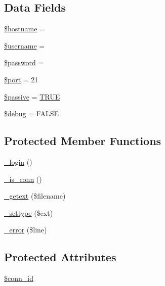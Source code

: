 \subsection*{Data Fields}
\begin{DoxyCompactItemize}
\item 
\mbox{\hyperlink{class_c_i___f_t_p_a8bf9ffb42ed554b203b55377d1fc9aa4}{\$hostname}} = \textquotesingle{}\textquotesingle{}
\item 
\mbox{\hyperlink{class_c_i___f_t_p_a0eb82aa5f81cf845de4b36cd653c42cf}{\$username}} = \textquotesingle{}\textquotesingle{}
\item 
\mbox{\hyperlink{class_c_i___f_t_p_a607686ef9f99ea7c42f4f3dd3dbb2b0d}{\$password}} = \textquotesingle{}\textquotesingle{}
\item 
\mbox{\hyperlink{class_c_i___f_t_p_aa0787efab4b22e8a212882f3409d4c77}{\$port}} = 21
\item 
\mbox{\hyperlink{class_c_i___f_t_p_a9fb61732ea9189fa2be5574ad3576d9c}{\$passive}} = \mbox{\hyperlink{constants_8php_ae04a3efe6aa42044f803ee90c2277846}{T\+R\+UE}}
\item 
\mbox{\hyperlink{class_c_i___f_t_p_a85ae3e64cd40e9564adceb010085e9dd}{\$debug}} = F\+A\+L\+SE
\end{DoxyCompactItemize}
\subsection*{Protected Member Functions}
\begin{DoxyCompactItemize}
\item 
\mbox{\hyperlink{class_c_i___f_t_p_a95562e7b8a41561f4b0b525d9c7fe701}{\+\_\+login}} ()
\item 
\mbox{\hyperlink{class_c_i___f_t_p_af20c08e4b61fe028e032b388cd73936a}{\+\_\+is\+\_\+conn}} ()
\item 
\mbox{\hyperlink{class_c_i___f_t_p_ab06ef33f96f03cafbb8f2bb6d695ef1f}{\+\_\+getext}} (\$filename)
\item 
\mbox{\hyperlink{class_c_i___f_t_p_aacd9d6628615078d8df9aab1fe70e391}{\+\_\+settype}} (\$ext)
\item 
\mbox{\hyperlink{class_c_i___f_t_p_ac618e7d56614851d2c54aa096e1bcace}{\+\_\+error}} (\$line)
\end{DoxyCompactItemize}
\subsection*{Protected Attributes}
\begin{DoxyCompactItemize}
\item 
\mbox{\hyperlink{class_c_i___f_t_p_a16c23f1dcbfed2f2759f5e54f604106d}{\$conn\+\_\+id}}
\end{DoxyCompactItemize}


